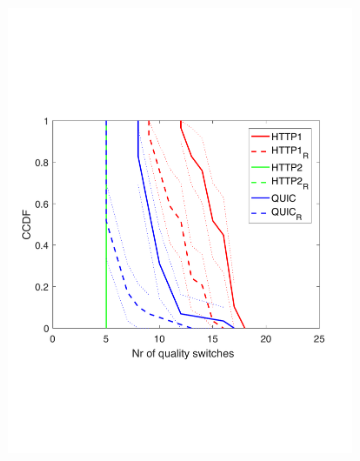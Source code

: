 \begin{figure}[htb!]
\begin{subfigure}[t]{0.33\textwidth}
    \includegraphics[trim={0 5cm 0 7cm}, scale=0.24]{figures/CDF_cntswitch_squad_udpw9_nd18.pdf}
    \caption{}
    \label{fig:udpw9cntsw}
  \end{subfigure}
  \begin{subfigure}[t]{0.33\textwidth}
  \captionsetup{justification=centering,margin=1.5cm}

\end{subfigure}
\end{figure}
